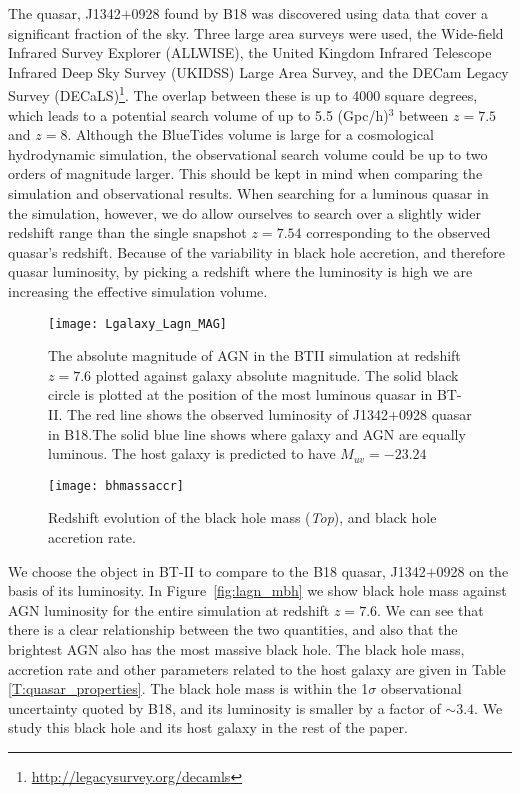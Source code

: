 \documentclass[twocolumn,useAMS,usenatbib]{mnras} \usepackage{natbib}
\begin{document}
The quasar, J1342$+$0928 found by B18 was discovered using data that
cover a significant fraction of the sky. 
Three large area surveys were used, the Wide-field Infrared Survey Explorer
(ALLWISE), the United Kingdom
Infrared Telescope Infrared Deep Sky Survey (UKIDSS) Large Area Survey, and the DECam Legacy
Survey (DECaLS)\footnote{\url{http://legacysurvey.org/decamls}}. The overlap between these
is up to 4000 square degrees, which leads to a potential search volume
of up to 5.5 (Gpc/h)$^{3}$ between $z=7.5$ and $z=8$. Although the BlueTides volume
is large for a cosmological hydrodynamic simulation, the observational search
volume could be up to two orders of magnitude larger. This should be kept 
in mind when comparing the simulation and observational results.
When searching for a luminous quasar in the simulation, however, we do allow ourselves to search over a slightly wider redshift range than the single
snapshot $z=7.54$ corresponding to the observed quasar's redshift. Because
of the variability in black hole accretion, and therefore quasar luminosity,
by picking a redshift where the luminosity is high we are 
increasing the effective simulation volume.




\begin{figure}
\texttt{[image: Lgalaxy\_Lagn\_MAG]}
\caption{\label{fig:Lgalaxy_Lagn_MAG} The absolute magnitude of AGN in the BTII simulation at redshift $z=7.6$ plotted against galaxy absolute
magnitude. The solid black circle is plotted at the position of the most luminous
quasar in BT-II. The red line shows the observed luminosity of 
J1342$+$0928 quasar in B18.The solid blue line shows where galaxy and AGN are equally luminous. The host galaxy is predicted to have $M_{uv}= -23.24$ }
\end{figure} 

\begin{figure}
\texttt{[image: bhmassaccr]}
\caption{\label{F:fig_quasar_props}  Redshift evolution of the black hole mass ({\em Top}), and black hole accretion rate.}
\end{figure}

We choose the object in BT-II to compare to the B18 quasar, J1342$+$0928 on the
basis of its luminosity. In Figure~\ref{fig:lagn_mbh} we show black hole mass against AGN luminosity for the entire simulation at redshift $z=7.6$. We can 
see that there is a clear relationship between the two quantities, and also that the brightest AGN also has the most massive black hole. The black hole mass,
accretion rate and other parameters related to the host galaxy are given in 
Table \ref{T:quasar_properties}. The black hole mass is within the 1$\sigma$  observational uncertainty quoted by B18, and its luminosity is smaller by a factor of $\sim 3.4$.  We study this black hole and its host galaxy in the rest
of the paper.
\end{document}
